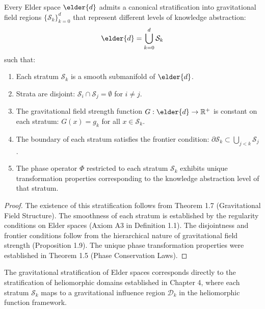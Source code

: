 \begin{theorem}
Every Elder space $\elder{d}$ admits a canonical stratification into gravitational field regions $\{\mathcal{S}_k\}_{k=0}^{d}$ that represent different levels of knowledge abstraction:
\begin{equation}
\elder{d} = \bigcup_{k=0}^{d} \mathcal{S}_k
\end{equation}
such that:
\begin{enumerate}
    \item Each stratum $\mathcal{S}_k$ is a smooth submanifold of $\elder{d}$.
    
    \item Strata are disjoint: $\mathcal{S}_i \cap \mathcal{S}_j = \emptyset$ for $i \neq j$.
    
    \item The gravitational field strength function $G: \elder{d} \rightarrow \mathbb{R}^+$ is constant on each stratum: $G(x) = g_k$ for all $x \in \mathcal{S}_k$.
    
    \item The boundary of each stratum satisfies the frontier condition: $\partial \mathcal{S}_k \subset \bigcup_{j < k} \mathcal{S}_j$.
    
    \item The phase operator $\Phi$ restricted to each stratum $\mathcal{S}_k$ exhibits unique transformation properties corresponding to the knowledge abstraction level of that stratum.
\end{enumerate}
\end{theorem}

\begin{proof}
The existence of this stratification follows from Theorem 1.7 (Gravitational Field Structure). The smoothness of each stratum is established by the regularity conditions on Elder spaces (Axiom A3 in Definition 1.1). The disjointness and frontier conditions follow from the hierarchical nature of gravitational field strength (Proposition 1.9). The unique phase transformation properties were established in Theorem 1.5 (Phase Conservation Laws).
\end{proof}

\begin{corollary}
The gravitational stratification of Elder spaces corresponds directly to the stratification of heliomorphic domains established in Chapter 4, where each stratum $\mathcal{S}_k$ maps to a gravitational influence region $\mathcal{D}_k$ in the heliomorphic function framework.
\end{corollary}

